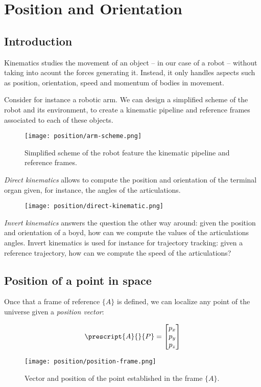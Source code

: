 \section{Position and Orientation}
\subsection{Introduction}
Kinematics studies the movement of an object -- in our case of a robot -- without taking into acount the forces generating it. Instead, it only handles aspects such as position, orientation, speed and momentum of bodies in movement.

Consider for instance a robotic arm. We can design a simplified scheme of the robot and its environment, to create a kinematic pipeline and reference frames associated to each of these objects.

\begin{figure}[H]
    \centering
    \texttt{[image: position/arm-scheme.png]}
    \caption{Simplified scheme of the robot feature the kinematic pipeline and reference frames.}
\end{figure}

\emph{Direct kinematics} allows to compute the position and orientation of the terminal organ given, for instance, the angles of the articulations.

\begin{figure}[H]
    \centering
    \texttt{[image: position/direct-kinematic.png]}
\end{figure}

\emph{Invert kinematics} answers the question the other way around: given the position and orientation of a boyd, how can we compute the values of the articulations angles. Invert kinematics is used for instance for trajectory tracking: given a reference trajectory, how can we compute the speed of the articulations?

\subsection{Position of a point in space}
Once that a frame of reference $\{A\}$ is defined, we can localize any point of the universe given a \emph{position vector}:
\begin{figure}[H]
    \centering

    \begin{minipage}{0.4\textwidth}
        \begin{equation*}
            \prescript{A}{}{P} = \begin{bmatrix}
                p_x \\ p_y \\ p_z
            \end{bmatrix}
        \end{equation*}
    \end{minipage}
    \begin{minipage}{0.4\textwidth}
        \centering
        \texttt{[image: position/position-frame.png]}
    \end{minipage}
    \caption{Vector and position of the point established in the frame $\{A\}$.}
\end{figure}